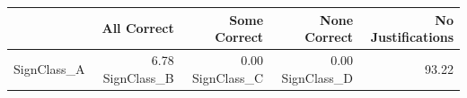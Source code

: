\begin{tabular}{lrrrr}
\toprule
 & All Correct & Some Correct & None Correct & No Justifications \\
\midrule
SignClass_A & 6.78%
SignClass_B & 0.00%
SignClass_C & 0.00%
SignClass_D & 93.22%
\bottomrule
\end{tabular}
